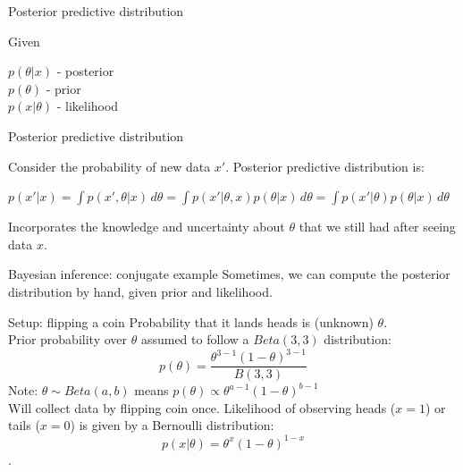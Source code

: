 \documentclass[10pt]{beamer}
\begin{document}

\begin{frame}{Posterior predictive distribution}

\begin{sblock}{Given}

$p(\theta | x)$ - posterior \\
$p(\theta)$ - prior \\
$p(x | \theta)$ - likelihood

\end{sblock}

\begin{sblock}{Posterior predictive distribution}

Consider the probability of new data $x'$. Posterior predictive distribution is:

$p(x' | x) = \int p(x', \theta | x) \, d\theta = \int p(x' | \theta, x) p(\theta |x) \, d\theta = \int p(x' | \theta) p(\theta | x) \, d\theta$

Incorporates the knowledge and uncertainty about $\theta$ that we still had after seeing data $x$.

\end{sblock}

\end{frame}





\begin{frame}{Bayesian inference: conjugate example}
Sometimes, we can compute the posterior distribution by hand, given prior and likelihood.

\begin{sblock}{Setup: flipping a coin}
Probability that it lands heads is (unknown) $\theta$. \\
Prior probability over $\theta$ assumed to follow a $Beta(3,3)$ distribution:
$$ p(\theta) = \frac{\theta^{3-1}(1-\theta)^{3-1}}{B(3,3)}$$
Note: $\theta \sim Beta(a, b)$ means $p(\theta) \propto \theta^{a-1}(1-\theta)^{b-1}$\\
Will collect data by flipping coin once. Likelihood of observing heads ($x=1$) or tails ($x=0$) is given by a Bernoulli distribution:
$$p(x | \theta) = \theta^x(1-\theta)^{1-x} $$.
\end{sblock}


\end{frame}
\end{document}
